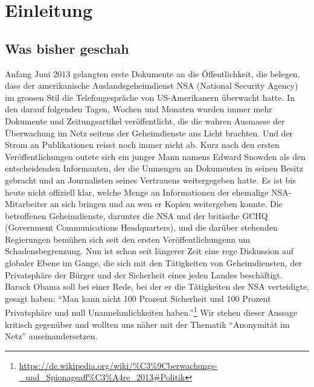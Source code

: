 \newpage
\section{Einleitung}

\subsection{Was bisher geschah}
Anfang Juni 2013 gelangten erste Dokumente an die Öffentlichkeit, die belegen, dass der amerikanische Auslandsgeheimdienst NSA (National Security Agency) im grossen Stil die Telefongespräche von US-Amerikanern überwacht hatte. In den darauf folgenden Tagen, Wochen und Monaten wurden immer mehr Dokumente und Zeitungsartikel veröffentlicht, die die wahren Ausmasse der Überwachung im Netz seitens der Geheimdienste ans Licht brachten. Und der Strom an Publikationen reisst noch immer nicht ab. Kurz nach den ersten Veröffentlichungen outete sich ein junger Mann namens Edward Snowden als den entscheidenden Informanten, der die Unmengen an Dokumenten in seinen Besitz gebracht und an Journalisten seines Vertrauens weitergegeben hatte. Es ist bis heute nicht offiziell klar, welche Menge an Informationen der ehemalige NSA-Mitarbeiter an sich bringen und an wen er Kopien weitergeben konnte. Die betroffenen Geheimdienste, darunter die NSA und der britische GCHQ (Government Communications Headquarters), und die darüber stehenden Regierungen bemühen sich seit den ersten Veröffentlichungenn um Schadensbegrenzung. Nun ist schon seit längerer Zeit eine rege Diskussion auf globaler Ebene im Gange, die sich mit den Tätigkeiten von Geheimdiensten, der Privatsphäre der Bürger und der Sicherheit eines jeden Landes beschäftigt. Barack Obama soll bei einer Rede, bei der er die Tätigkeiten der NSA verteidigte, gesagt haben: ``Man kann nicht 100 Prozent Sicherheit und 100 Prozent Privatsphäre und null Unannehmlichkeiten haben.''\footnote{\url{https://de.wikipedia.org/wiki/\%C3\%9Cberwachungs-_und_Spionageaff\%C3\%A4re_2013\#Politik}}
Wir stehen dieser Aussage kritisch gegenüber und wollten uns näher mit der Thematik ``Anonymität im Netz'' auseinandersetzen.


